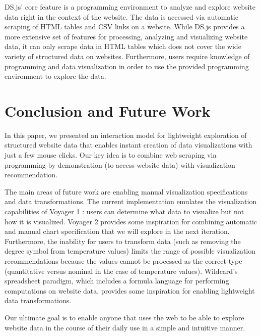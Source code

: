 \documentclass{vgtc}                          %
\begin{document}
DS.js' core feature is a programming environment to analyze and explore
website data right in the context of the website. The data is accessed
via automatic scraping of HTML tables and CSV links on a website. While
DS.js provides a more extensive set of features for processing, analyzing and
visualizing website data, it can only scrape data in HTML tables which
does not cover the wide variety of structured data on websites.
Furthermore, users require knowledge of programming and data visualization in order to use
the provided programming environment to explore the data.

\section{Conclusion and Future Work} \label{conclusion}

In this paper, we presented an interaction model for lightweight exploration
of structured website data that enables instant creation of data visualizations with 
just a few mouse clicks. Our key idea is to combine web scraping via programming-by-demonstration (to access
website data) with visualization recommendation.

The main areas of future work are enabling manual visualization specifications and
data transformations. The current implementation emulates the
visualization capabilities of Voyager 1 \cite{wongsuphasawat2016a}:
users can determine what data to visualize but not how it is visualized. Voyager 2 
\cite{wongsuphasawat2017} provides some inspiration for combining automatic
and manual chart specification that we will explore in the next iteration.
Furthermore, the inability for users to transform data (such as removing
the degree symbol from temperature values) limits the range of possible
visualization recommendations because the values cannot be processed as the
correct type (quantitative versus nominal in the case of temperature values). Wildcard's
\cite{litt2020} spreadsheet paradigm, which includes a formula language for performing
computations on website data, provides some inspiration for enabling lightweight data
transformations.

Our ultimate goal is to enable anyone that uses the web to be able to explore website data in
the course of their daily use in a simple and intuitive manner.

%

%
%
%


\end{document}
